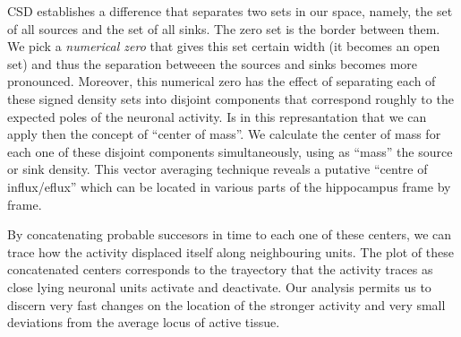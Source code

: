 CSD establishes a difference that separates two sets in our space, namely, the set
of all sources and the set of all sinks. The zero set is the border between them.
We pick a \emph{numerical zero} that gives this set certain width (it becomes an
open set) and thus the separation betweeen the sources and sinks becomes more
pronounced. Moreover, this numerical zero has the effect of separating each
of these signed density sets into disjoint components that correspond
roughly to the expected poles of the neuronal activity. Is in this represantation
that we can apply then the concept of ``center of mass''. We calculate the
center of mass for each one of these disjoint components simultaneously, using
as ``mass'' the source or sink density. This vector averaging technique reveals a putative ``centre of influx/eflux'' which can be located in various parts of the hippocampus
frame by frame.

By concatenating probable succesors in time to each one of these centers, we can
trace how the activity displaced itself along neighbouring units. The plot of these
concatenated centers corresponds to the trayectory that the activity traces as
close lying neuronal units activate and deactivate. Our analysis permits us to
discern very fast changes on the location of the stronger activity and very small
deviations from the average locus  of active tissue. 
